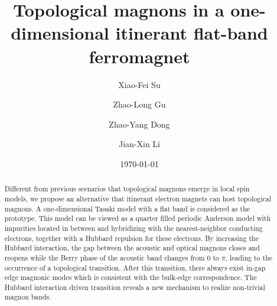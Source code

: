 \documentclass[amsmath,superscriptaddress,showpacs,aps,prb,twocolumn]{revtex4-1}
\begin{document}
\title{Topological magnons in a one-dimensional itinerant flat-band ferromagnet}
\author{Xiao-Fei Su}
\author{Zhao-Long Gu}
\author{Zhao-Yang Dong}
\author{Jian-Xin Li}
\date{\today}

\begin{abstract}

\par Different from previous scenarios that topological magnons emerge in local spin models, we propose an alternative that itinerant electron magnets can host topological magnons. A one-dimensional Tasaki model with a flat band is considered as the prototype. This model can be viewed as a quarter filled periodic Anderson model with impurities located in between and hybridizing with the nearest-neighbor conducting electrons, together with a Hubbard repulsion for these electrons. By increasing the Hubbard interaction, the gap between the acoustic and optical magnons closes and reopens while the Berry phase of the acoustic band changes from 0 to $\pi$, leading to the occurrence of a topological transition. After this transition, there always exist in-gap edge magnonic modes which is consistent with the bulk-edge correspondence. The Hubbard interaction driven transition reveals a new mechanism to realize non-trivial magnon bands.

\end{abstract}

\maketitle
\end{document}
